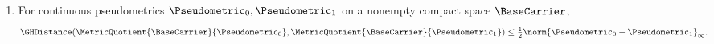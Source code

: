 \begin{proposition}
\begin{enumerate}[label=\textup{(Q\arabic*)},ref=\textup{(Q\arabic*)}]
\begin{equation}
 \leq(1-\HomotopyTime)\PseudometricError_\Correspondence(\Pseudometric_0,\ComparisonPseudometric_0)
       +\HomotopyTime\PseudometricError_\Correspondence(\Pseudometric_1,\ComparisonPseudometric_1).
\end{equation}
\item\label{item:quotient-4}
For continuous pseudometrics
$\Pseudometric_0,\Pseudometric_1$
on a nonempty compact space
$\BaseCarrier$,
\begin{equation}\label{eq:pseudometric-bound}
 \GHDistance(\MetricQuotient{\BaseCarrier}{\Pseudometric_0},\MetricQuotient{\BaseCarrier}{\Pseudometric_1})
 \leq\tfrac12\norm{\Pseudometric_0-\Pseudometric_1}_\infty.
\end{equation}
\end{enumerate}
\end{proposition}

